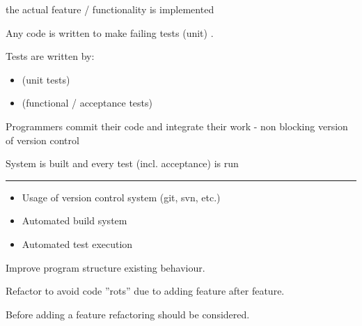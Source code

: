 \documentclass[
    ../../Software_Engineering_Summary.tex,
]
{subfiles}
\begin{document}
\begin{defbox}
    \begin{center}
    \end{center}
     the actual feature / functionality is implemented

    Any code is written to make failing tests (unit) .

    Tests are written by:
    \begin{itemize}
        \item {} (unit tests)
        \item {} (functional / acceptance tests) 
    \end{itemize}
\end{defbox}

\begin{defbox}
    Programmers commit their code and integrate their work  - non blocking version of version control

     System is built and every test (incl. acceptance) is run

    \hrule
    \vspace{5pt}
    \begin{itemize}
        \item Usage of version control system (git, svn, etc.)
        \item Automated build system
        \item Automated test execution
    \end{itemize}
\end{defbox}

\begin{defbox}
    Improve program structure  existing behaviour.

    Refactor  to avoid code ''rots'' due to adding feature after feature.

    Before adding a feature refactoring should be considered.
\end{defbox}
\end{document}
